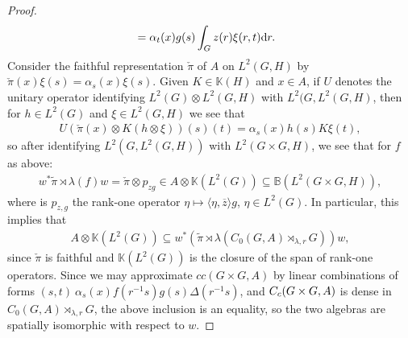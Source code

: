 \begin{proof}
\begin{align*}
		&= \alpha_t(x) g(s) \int_G z(r) \xi(r,t) \mathrm{d} r.
	\end{align*}
	Consider the faithful representation $\check \pi$ of $A$ on $L^2(G,H)$ by $\check \pi(x) \xi(s) = \alpha_s(x) \xi(s)$. Given $K \in \mathbb{K}(H)$ and $x \in A$, if $U$ denotes the unitary operator identifying $L^2(G) \otimes L^2(G,H)$ with $L^2(G, L^2(G, H)$, then for $h \in L^2(G)$ and $\xi \in L^2(G,H)$ we see that
	\begin{align*}
		U (\check \pi(x) \otimes K (h \otimes \xi))(s)(t) = \alpha_s(x) h(s) K \xi(t),
	\end{align*}
	so after identifying $L^2(G,L^2(G,H))$ with $L^2(G \times G,H)$, we see that for $f$ as above:
	\begin{align*}
		w^* \tilde \pi \rtimes \lambda (f) w  = \check \pi \otimes p_{zg} \in A \otimes \mathbb{K}(L^2(G)) \subseteq \mathbb{B}(L^2(G \times G, H)),
	\end{align*}
	where is $p_{z,g}$ the rank-one operator $\eta \mapsto \langle \eta , \overline z \rangle g$, $\eta \in L^2(G)$.
	In particular, this implies that 
	\begin{align*}
		A \otimes \mathbb{K}(L^2(G)) \subseteq w^* (\tilde \pi \rtimes \lambda (C_0(G,A) \rtimes_{\lambda, r} G))w,
	\end{align*}
	since $\check \pi$ is faithful and $\mathbb{K}(L^2(G))$ is the closure of the span of rank-one operators. Since we may approximate $cc(G \times G, A)$ by linear combinations of forms $(s,t) \ \alpha_s(x)  f(r^{-1}s)g(s) \Delta(r^{-1}s)$, and $C_c(G \times G, A)$ is dense in $C_0(G,A) \rtimes_{\lambda, r}G$, the above inclusion is an equality, so the two algebras are spatially isomorphic with respect to $w$.


\end{proof}
